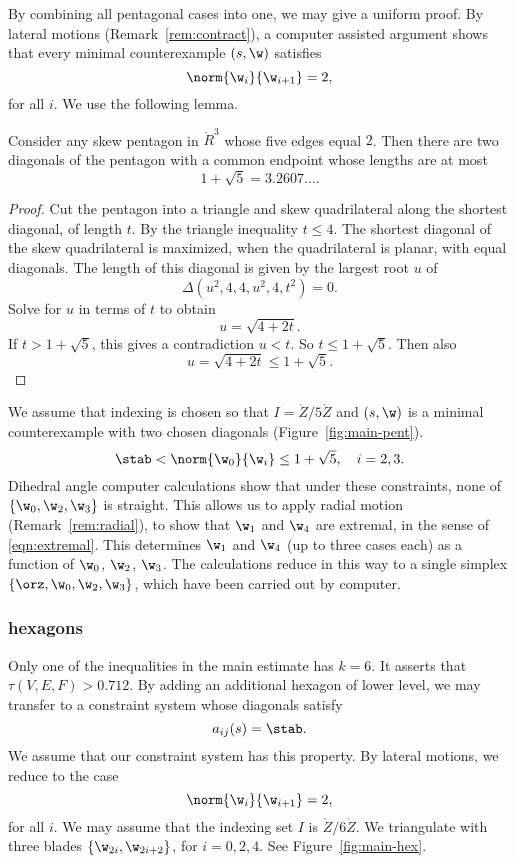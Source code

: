 By combining all pentagonal cases into one, we may give a uniform proof.
 By
lateral motions (Remark~\ref{rem:contract}), a computer assisted
argument shows that every minimal counterexample $(s,\w)$ satisfies
\[
\norm{\w_i}{\w_{i+1}} = 2,
\]
for all $i$.  We use the following lemma.

\begin{lemma}
Consider any skew pentagon in $\ring{R}^3$ whose five edges equal $2$.
Then there are two  diagonals  of the pentagon with a common
endpoint whose lengths  are at most
\[
1 + \sqrt{5} = 3.2607\ldots.
\]
\end{lemma}

\begin{proof}
  Cut the pentagon into a triangle and skew quadrilateral along the
  shortest diagonal, of length $t$.  By the triangle inequality
  $t\le4$.  The shortest diagonal of the skew quadrilateral is
  maximized, when the quadrilateral is planar, with equal diagonals.
  The length of this diagonal is given by the largest root $u$ of
\[
\Delta(u^2,4,4,u^2,4,t^2)=0.
\]
Solve for $u$ in terms of $t$ to obtain
\[
u = \sqrt{4 + 2 t}.
\]
If $t>1+\sqrt{5}$, this gives a contradiction $u<t$.  
So $t\le 1+\sqrt{5}$.
Then also
\[
u = \sqrt{4 + 2t} \le 1+\sqrt{5}.
\]
\end{proof}

\figLZBQINL %


We assume that indexing is chosen so that $I=\ring{Z}/5\ring{Z}$ and
 $(s,\w)$ is a minimal
counterexample with two chosen diagonals (Figure~\ref{fig:main-pent}).
\[
\stab < \norm{\w_0}{\w_i} \le 1+\sqrt{5},\quad i=2,3.
\]
Dihedral angle computer calculations show that under these
constraints, none of $\{\w_0,\w_2,\w_3\}$ is straight.  This allows
us to apply radial motion (Remark~\ref{rem:radial}), to show that
$\w_1$ and $\w_4$ are extremal, in the sense of \eqref{eqn:extremal}.
This determines $\w_1$ and $\w_4$ (up to three cases each) as a
function of $\w_0$, $\w_2$, $\w_3$.  The calculations reduce in this
way to a single simplex $\{\orz,\w_0,\w_2,\w_3\}$, which have been
carried out by computer.

\subsubsection{hexagons}

Only one of the inequalities in the main estimate has $k=6$.  It
asserts that $\tau(V,E,F) > 0.712$.  By adding an additional hexagon
of lower level, we may transfer to a constraint system whose diagonals
satisfy
\begin{equation}\label{eqn:astab}
a_{ij}(s)=\stab.
\end{equation}  
We assume that our constraint system
has this property.
By lateral motions, we reduce to the case
\[
\norm{\w_i}{\w_{i+1}}=2,
\]
for all $i$.  We may assume that the indexing set $I$ is $\ring{Z}/{6\ring{Z}}$. 
We triangulate with three blades
$\{\w_{2i},\w_{2i+2}\}$, for $i=0,2,4$.  See Figure~\ref{fig:main-hex}.

